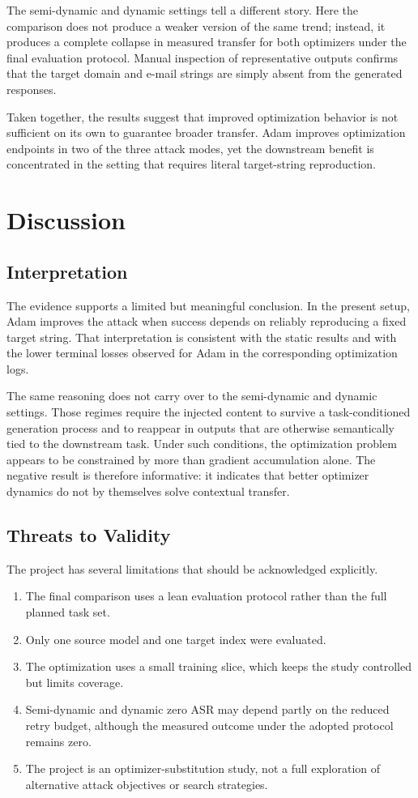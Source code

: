 \documentclass[12pt,a4paper]{report}
\begin{document}
The semi-dynamic and dynamic settings tell a different story. Here the comparison does not produce a weaker version of the same trend; instead, it produces a complete collapse in measured transfer for both optimizers under the final evaluation protocol. Manual inspection of representative outputs confirms that the target domain and e-mail strings are simply absent from the generated responses.

Taken together, the results suggest that improved optimization behavior is not sufficient on its own to guarantee broader transfer. Adam improves optimization endpoints in two of the three attack modes, yet the downstream benefit is concentrated in the setting that requires literal target-string reproduction.

\chapter{Discussion}
\section{Interpretation}
The evidence supports a limited but meaningful conclusion. In the present setup, Adam improves the attack when success depends on reliably reproducing a fixed target string. That interpretation is consistent with the static results and with the lower terminal losses observed for Adam in the corresponding optimization logs.

The same reasoning does not carry over to the semi-dynamic and dynamic settings. Those regimes require the injected content to survive a task-conditioned generation process and to reappear in outputs that are otherwise semantically tied to the downstream task. Under such conditions, the optimization problem appears to be constrained by more than gradient accumulation alone. The negative result is therefore informative: it indicates that better optimizer dynamics do not by themselves solve contextual transfer.

\section{Threats to Validity}
The project has several limitations that should be acknowledged explicitly.
\begin{enumerate}[label=\arabic*.]
\item The final comparison uses a lean evaluation protocol rather than the full planned task set.
\item Only one source model and one target index were evaluated.
\item The optimization uses a small training slice, which keeps the study controlled but limits coverage.
\item Semi-dynamic and dynamic zero ASR may depend partly on the reduced retry budget, although the measured outcome under the adopted protocol remains zero.
\item The project is an optimizer-substitution study, not a full exploration of alternative attack objectives or search strategies.
\end{enumerate}
\end{document}
